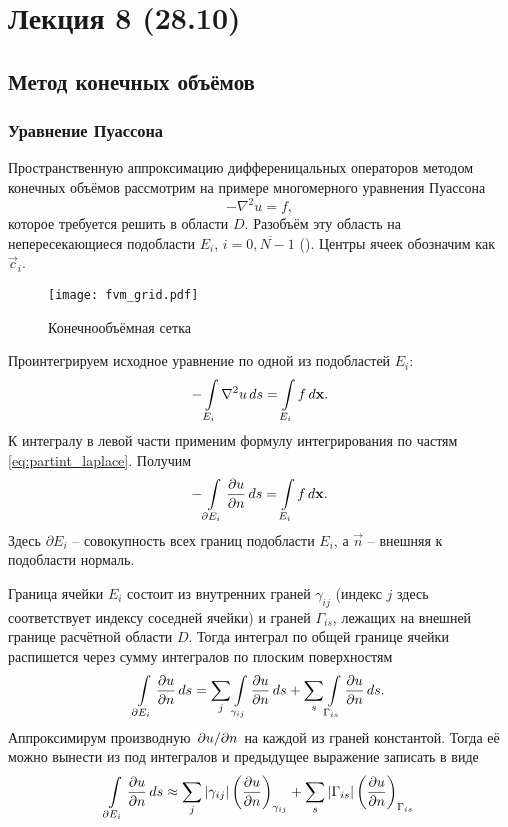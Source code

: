 \section{Лекция 8 (28.10)}

\subsection{Метод конечных объёмов}
\subsubsection{Уравнение Пуассона}
Пространственную аппроксимацию дифференицальных операторов
методом конечных объёмов рассмотрим на примере многомерного уравнения Пуассона
\begin{equation}
\label{eq:fvm_pois}
-\nabla^2 u = f,
\end{equation}
которое требуется решить в области $D$. Разобъём эту область
на непересекающиеся подобласти $E_i$, $i = \overline{0, N-1}$ ().
Центры ячеек обозначим как $\vec c_i$.


\begin{figure}[h!]
\centering
\texttt{[image: fvm\_grid.pdf]}
\caption{Конечнообъёмная сетка}
\label{fig:fvm_grid}
\end{figure}

Проинтегрируем исходное уравнение
по одной из подобластей $E_i$:
\begin{equation*}
-\arint{\nabla^2 u}{E_i}{s} = \arint{f}{E_i}{\vec x}.
\end{equation*}
К интегралу в левой части применим формулу интегрирования по частям \cref{eq:partint_laplace}. Получим
\begin{equation}
\label{eq:fvm_pois_int}
-\arint{\dfr{u}{n}}{\partial E_i}{s} = \arint{f}{E_i}{\vec x}.
\end{equation}
Здесь $\partial E_i$ -- совокупность всех границ подобласти $E_i$,
а $\vec n$ -- внешняя к подобласти нормаль.

Граница ячейки $E_i$ состоит из внутренних граней $\gamma_{ij}$ (индекс $j$ здесь
соответствует индексу соседней ячейки)
и граней $\Gamma_{is}$, лежащих на внешней границе расчётной области $D$.
Тогда интеграл по общей границе ячейки распишется через сумму интегралов по плоским поверхностям
$$
\arint{\dfr{u}{n}}{\partial E_i}{s} = \sum_j\arint{\dfr{u}{n}}{\gamma_{ij}}{s} + \sum_s\arint{\dfr{u}{n}}{\Gamma_{is}}{s}.
$$
Аппроксимирум производную $\dsfr{u}{n}$ на каждой из граней константой.
Тогда её можно вынести из под интегралов и предыдущее выражение записать в виде
\begin{equation}
\label{eq:fvm_gamma_integral}
\arint{\dfr{u}{n}}{\partial E_i}{s} \approx
\sum_j
    \left|
        \gamma_{ij}
    \right|
    \left(
        \dfr{u}{n}
    \right)_{\gamma_{ij}}
+\sum_s
    \left|
        \Gamma_{is}
    \right|
    \left(
        \dfr{u}{n}
    \right)_{\Gamma_{is}}
\end{equation}

